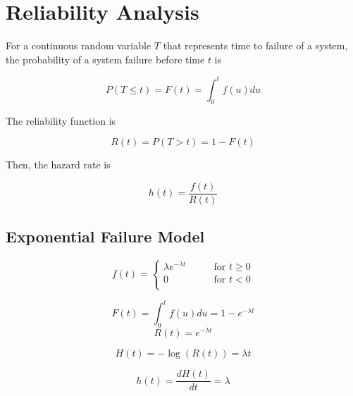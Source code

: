 \section{Reliability Analysis} %
\label{sec:reliability_analysis}

For a continuous random variable $T$ that represents time to failure of a system, the probability of a system failure before time $t$ is

\begin{equation}
  P(T \leq t) = F(t) = \int^t_0 f(u) du
\end{equation}

The reliability function is

\begin{equation}
  R(t) = P(T > t) = 1 - F(t)
\end{equation}

Then, the hazard rate is

\begin{equation}
  h(t) = \frac{f(t)}{R(t)}
\end{equation}


\subsection{Exponential Failure Model} %
\label{sub:exponential_failure_model}

\begin{equation}
  f(t) = \begin{cases}
    \lambda e^{-\lambda t} \qquad &\text{for } t \geq 0 \\
    0 \qquad &\text{for } t < 0 \\
  \end{cases}
\end{equation}
\begin{multicols}{2}
\begin{equation}
  F(t) = \int^t_0 f(u) du = 1 - e^{-\lambda t}
\end{equation}
\begin{equation}
  R(t) = e^{-\lambda t}
\end{equation}

\begin{equation}
  H(t) = - \log(R(t))  = \lambda t
\end{equation}

\begin{equation}
  h(t) = \frac{dH(t)}{dt} = \lambda
\end{equation}
\end{multicols}


